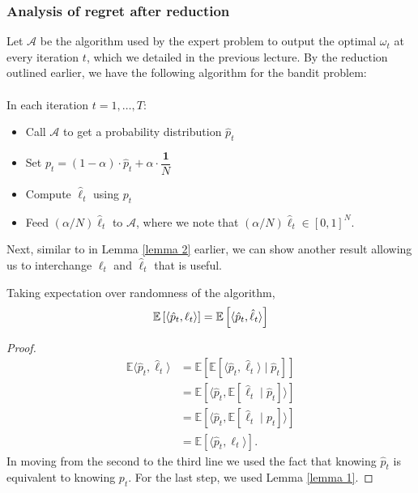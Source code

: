 \documentclass[11pt]{article}
\begin{document}
\subsubsection{Analysis of regret after reduction}
Let $\mathcal{A}$ be the algorithm used by the expert problem to output the optimal $\omega_t$ at every iteration $t$, which we detailed in the previous lecture. By the reduction outlined earlier, we have the following algorithm for the bandit problem:
\paragraph{}
In each iteration $t = 1,\dots,T$:
\begin{itemize}
    \item Call $\mathcal{A}$ to get a probability distribution $\hat{p}_t$ 
    \item Set $p_t = (1 - \alpha) \cdot \hat{p}_t + \alpha \cdot \dfrac{\mathbf{1}}{N}$
    \item Compute $\hat{\ell}_t$ using $p_t$
    \item Feed $(\alpha/N) \hat{\ell}_t$ to $\mathcal{A}$, where we note that $(\alpha/N) \hat{\ell}_t \in [0,1]^N$.
\end{itemize}


Next, similar to in Lemma \ref{lemma 2} earlier, we can show another result allowing us to interchange $\ell_t$ and $\hat{\ell}_t$ that is useful. 

\begin{lemma}\label{lemma 3}
    Taking expectation over randomness of the algorithm, 
    $$\mathbb{E} \left[\langle \hat{p}_t, \ell_t \rangle \right] = \mathbb{E} \left[\langle \hat{p}_t, \hat{\ell}_t \rangle \right]$$
\end{lemma}

\begin{proof}
\begin{align*}
\mathbb{E} \langle \hat{p}_t, \hat{\ell}_t \rangle &= \mathbb{E} \left [ \mathbb{E} \left[ \langle \hat{p}_t, \hat{\ell}_t \rangle  \mid \hat{p}_t \right] \right ]\\
&=  \mathbb{E} \left [ \langle \hat{p}_t , \mathbb{E} \left[ \hat{\ell}_t  \mid \hat{p}_t \right]  \rangle\right] \\
&=  \mathbb{E} \left [ \langle \hat{p}_t , \mathbb{E} \left[ \hat{\ell}_t  \mid p_t  \right] \rangle \right] \\
&=  \mathbb{E} \left [ \langle \hat{p}_t , \ell_t \rangle \right].
\end{align*} 
In moving from the second to the third line we used the fact that knowing $\hat{p}_t$ is equivalent to knowing $p_t$. For the last step, we used Lemma \ref{lemma 1}. 
\end{proof}
\end{document}
